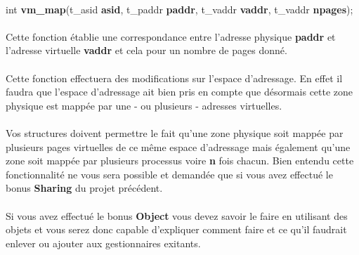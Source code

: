 \documentclass[10pt,a4wide]{article}
\begin{document}
\paragraph{}

\hspace{1.5cm}int \textbf{vm\_map}(t\_asid \textbf{asid},
				   t\_paddr \textbf{paddr},
                                   t\_vaddr \textbf{vaddr},
                                   t\_vaddr \textbf{npages});

\paragraph{}

Cette fonction \'etablie une correspondance entre l'adresse physique
\textbf{paddr} et l'adresse virtuelle \textbf{vaddr} et cela pour
un nombre de pages donn\'e.

\paragraph{}

Cette fonction effectuera des modifications sur l'espace d'adressage.
En effet il faudra que l'espace d'adressage ait bien pris en compte que
d\'esormais cette zone physique est mapp\'ee par une - ou plusieurs -
adresses virtuelles.

\paragraph{}

Vos structures doivent permettre le fait qu'une zone physique soit mapp\'ee
par plusieurs pages virtuelles de ce m\^eme espace d'adressage mais \'egalement
qu'une zone soit mapp\'ee par plusieurs processus voire \textbf{n} fois
chacun. Bien entendu cette fonctionnalit\'e ne vous sera possible et demand\'ee
que si vous avez effectu\'e le bonus \textbf{Sharing} du projet pr\'ec\'edent.

\paragraph{}

Si vous avez effectu\'e le bonus \textbf{Object} vous devez savoir le faire
en utilisant des objets et vous serez donc capable d'expliquer comment
faire et ce qu'il faudrait enlever ou ajouter aux gestionnaires exitants.

\paragraph{}
\end{document}
